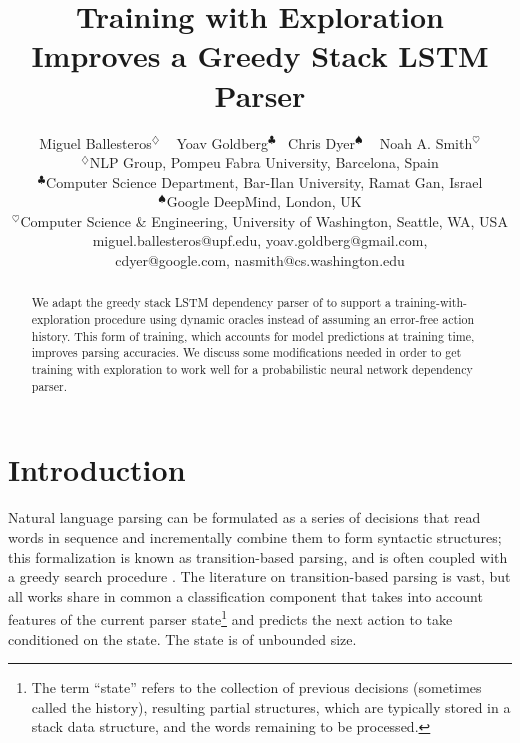 \documentclass[11pt]{article}
\begin{document}
\title{Training with Exploration Improves a Greedy Stack LSTM Parser}
\author{Miguel Ballesteros$^{\diamondsuit}$ ~ Yoav Goldberg$^{\clubsuit}$~ Chris Dyer$^{\spadesuit}$ ~ Noah A. Smith$^{\heartsuit}$\\
$^\diamondsuit$NLP Group, Pompeu Fabra University, Barcelona, Spain \\
$^\clubsuit$Computer Science Department, Bar-Ilan University, Ramat Gan, Israel \\
$^\spadesuit$Google DeepMind, London, UK \\
$^{\heartsuit}$Computer Science \& Engineering, University of Washington, Seattle, WA, USA\\
{ \sf miguel.ballesteros@upf.edu, yoav.goldberg@gmail.com, } \\
{\sf  cdyer@google.com, nasmith@cs.washington.edu}
}


\maketitle              


\begin{abstract}
    We adapt the greedy stack LSTM dependency parser of  to support a
    training-with-exploration procedure using dynamic oracles
    \cite{goldberg2013training} instead of assuming an error-free
    action history. This form of training, which accounts for model predictions at training time, improves
    parsing accuracies.  We discuss some modifications needed in order
    to get training with exploration to work well for a probabilistic
    neural network
    dependency parser.
\end{abstract}

\section{Introduction}

Natural language parsing can be formulated as a series of decisions that read
words in sequence and incrementally combine them to form syntactic structures;
this formalization is known as transition-based parsing, and is often coupled
with a greedy search procedure
\cite{yamada03,nivre03iwpt,nivre2004,nivre08cl}. 
The literature on transition-based parsing is vast, but all works share in
common a classification component that takes into account features of the current
parser state\footnote{The term ``state''
 refers to the collection of previous decisions (sometimes called the history),
 resulting partial structures, which are typically stored in a stack data structure,
 and the words remaining to be processed.} and predicts the next action to
 take conditioned on the state. The state is of unbounded size.
\end{document}
